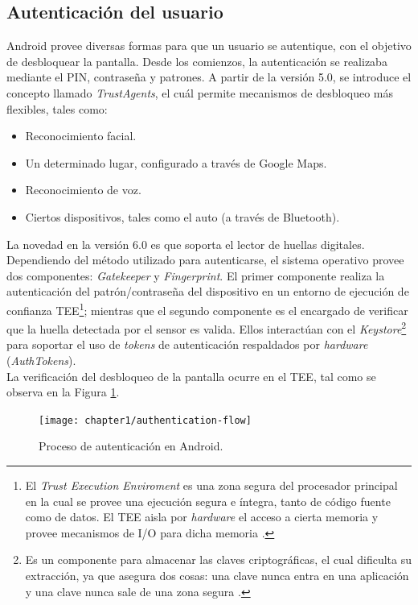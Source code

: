 \subsection{Autenticación del usuario}
Android provee diversas formas para que un usuario se autentique, con el objetivo de desbloquear la pantalla. Desde los comienzos, la autenticación se realizaba mediante el PIN, contraseña y patrones. A partir de la versión 5.0, se introduce el concepto llamado \textit{TrustAgents}, el cuál permite mecanismos de desbloqueo más flexibles, tales como:
\begin{itemize}
	\item Reconocimiento facial.
	\item Un determinado lugar, configurado a través de Google Maps.
	\item Reconocimiento de voz.
	\item Ciertos dispositivos, tales como el auto (a través de Bluetooth).
\end{itemize}
La novedad en la versión 6.0 es que soporta el lector de huellas digitales.\\
Dependiendo del método utilizado para autenticarse, el sistema operativo provee dos componentes: \textit{Gatekeeper} y \textit{Fingerprint}. El primer componente realiza la autenticación del patrón/contraseña del dispositivo en un entorno de ejecución de confianza TEE\footnote{El \textit{Trust Execution Enviroment} es una zona segura del procesador principal en la cual se provee una ejecución segura e íntegra, tanto de código fuente como de datos. El TEE aisla por \textit{hardware} el acceso a cierta memoria y provee mecanismos de I/O para dicha memoria \cite{tee2011}.}; mientras que el segundo componente es el encargado de verificar que la huella detectada por el sensor es valida. Ellos interactúan con el \textit{Keystore}\footnote{Es un componente para almacenar las claves criptográficas, el cual dificulta su extracción, ya que asegura dos cosas: una clave nunca entra en una aplicación y una clave nunca sale de una zona segura \cite{dakss}.} para soportar el uso de \textit{tokens} de autenticación respaldados por \textit{hardware} (\textit{AuthTokens}).\\
La verificación del desbloqueo de la pantalla ocurre en el TEE, tal como se observa en la Figura \ref{fig:ch01:authentication-flow}.
\begin{figure}[htbp]
	\begin{center}
		\texttt{[image: chapter1/authentication-flow]}
		\caption{Proceso de autenticación en Android\cite{aossec}.}
		\label{fig:ch01:authentication-flow}
	\end{center}
\end{figure}
